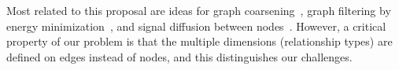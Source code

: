 Most related to this proposal are ideas for graph coarsening~\cite{LafonPAMI,RonCoarsening}, graph filtering by energy minimization~\cite{Grady10}, and signal diffusion between nodes~\cite{Geman_diffusion,Black_diffusion,Perona_diffusion,Bouman_diffusion,Zhangdiffusion}. However, a critical property of our problem is that the multiple dimensions (relationship types) are defined on edges instead of nodes, and this distinguishes our challenges. 














